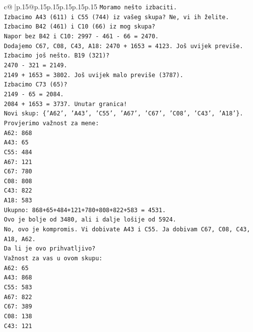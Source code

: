 \documentclass{article}
\begin{document}
{\begin{supertabular}{c@{$\;$}|p{.15\linewidth}@{}p{.15\linewidth}p{.15\linewidth}p{.15\linewidth}p{.15\linewidth}p{.15\linewidth}}
{{{\texttt{Moramo nešto izbaciti.} \\
\texttt{Izbacimo A43 (611) i C55 (744) iz vašeg skupa? Ne, vi ih želite.} \\
\texttt{Izbacimo B42 (461) i C10 (66) iz mog skupa?} \\
\texttt{Napor bez B42 i C10: 2997 {-} 461 {-} 66 = 2470.} \\
\texttt{Dodajemo C67, C08, C43, A18: 2470 + 1653 = 4123. Još uvijek previše.} \\
\texttt{Izbacimo još nešto. B19 (321)?} \\
\texttt{2470 {-} 321 = 2149.} \\
\texttt{2149 + 1653 = 3802. Još uvijek malo previše (3787).} \\
\texttt{Izbacimo C73 (65)?} \\
\texttt{2149 {-} 65 = 2084.} \\
\texttt{2084 + 1653 = 3737. Unutar granica!} \\
\texttt{Novi skup: \{'A62', 'A43', 'C55', 'A67', 'C67', 'C08', 'C43', 'A18'\}.} \\
\texttt{Provjerimo važnost za mene:} \\
\texttt{A62: 868} \\
\texttt{A43: 65} \\
\texttt{C55: 484} \\
\texttt{A67: 121} \\
\texttt{C67: 780} \\
\texttt{C08: 808} \\
\texttt{C43: 822} \\
\texttt{A18: 583} \\
\texttt{Ukupno: 868+65+484+121+780+808+822+583 = 4531.} \\
\texttt{Ovo je bolje od 3480, ali i dalje lošije od 5924.} \\
\texttt{No, ovo je kompromis. Vi dobivate A43 i C55. Ja dobivam C67, C08, C43, A18, A62.} \\
\texttt{Da li je ovo prihvatljivo?} \\
\texttt{Važnost za vas u ovom skupu:} \\
\texttt{A62: 65} \\
\texttt{A43: 868} \\
\texttt{C55: 583} \\
\texttt{A67: 822} \\
\texttt{C67: 389} \\
\texttt{C08: 138} \\
\texttt{C43: 121} \\
}}}
\end{supertabular}}
\end{document}
